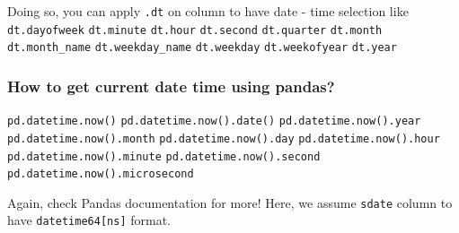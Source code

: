 \documentclass[11pt]{article}
\begin{document}
Doing so, you can apply \texttt{.dt} on column to have date - time
selection like \texttt{dt.dayofweek} \texttt{dt.minute} \texttt{dt.hour}
\texttt{dt.second} \texttt{dt.quarter} \texttt{dt.month}
\texttt{dt.month\_name} \texttt{dt.weekday\_name} \texttt{dt.weekday}
\texttt{dt.weekofyear} \texttt{dt.year}

\hypertarget{how-to-get-current-date-time-using-pandas}{%
\subsubsection{How to get current date time using
pandas?}\label{how-to-get-current-date-time-using-pandas}}

\texttt{pd.datetime.now()} \texttt{pd.datetime.now().date()}
\texttt{pd.datetime.now().year} \texttt{pd.datetime.now().month}
\texttt{pd.datetime.now().day} \texttt{pd.datetime.now().hour}
\texttt{pd.datetime.now().minute} \texttt{pd.datetime.now().second}
\texttt{pd.datetime.now().microsecond}

Again, check Pandas documentation for more! Here, we assume
\texttt{sdate} column to have \texttt{datetime64{[}ns{]}} format.
\end{document}
